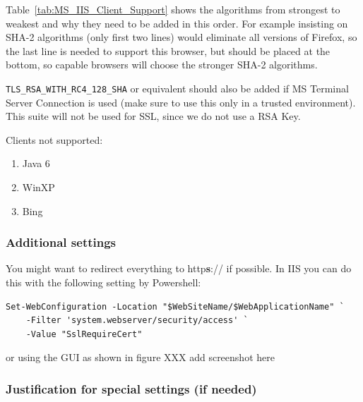 Table~\ref{tab:MS_IIS_Client_Support} shows the algorithms from
strongest to weakest and why they need to be added in this order. For
example insisting on SHA-2 algorithms (only first two lines) would
eliminate all versions of Firefox, so the last line is needed to
support this browser, but should be placed at the bottom, so capable
browsers will choose the stronger SHA-2 algorithms.

\verb|TLS_RSA_WITH_RC4_128_SHA| or equivalent should also be added if
MS Terminal Server Connection is used (make sure to use this only in a
trusted environment). This suite will not be used for SSL, since we do
not use a RSA Key.




Clients not supported:
\begin{enumerate}
\item Java 6
\item WinXP
\item Bing
\end{enumerate}

\subsubsection{Additional settings}

You might want to redirect everything to http\textbf{s}:// if possible. In IIS you can do this with the following setting by Powershell:

\begin{lstlisting}[breaklines]
Set-WebConfiguration -Location "$WebSiteName/$WebApplicationName" `
    -Filter 'system.webserver/security/access' `
    -Value "SslRequireCert"
\end{lstlisting}

or using the GUI as shown in figure XXX
\todo add screenshot here



\subsubsection{Justification for special settings (if needed)}


